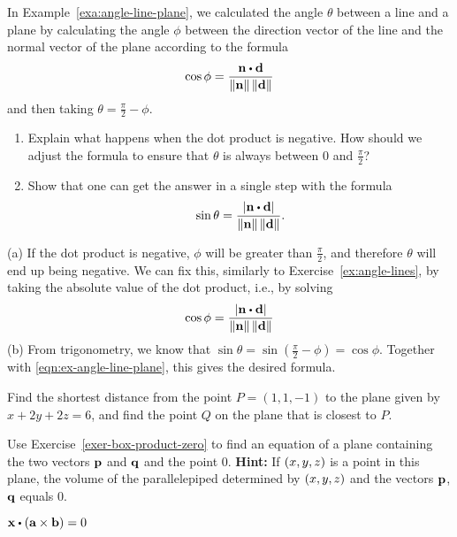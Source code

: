 \begin{enumialphparenastyle}
\begin{ex}
  In Example~\ref{exa:angle-line-plane}, we calculated the angle
  $\theta$ between a line and a plane by calculating the angle $\phi$
  between the direction vector of the line and the normal vector of
  the plane according to the formula
  \begin{equation*}
    \cos\phi =
    \frac{\vect{n}\dotprod\vect{d}}{\norm{\vect{n}}\norm{\vect{d}}}
  \end{equation*}
  and then taking $\theta = \frac{\pi}{2}-\phi$.
  \begin{enumerate}
  \item Explain what happens when the dot product is negative. How
    should we adjust the formula to ensure that $\theta$ is always
    between $0$ and $\frac{\pi}{2}$?
  \item Show that one can get the answer in a single step with the
    formula
    \begin{equation*}
      \sin\theta =
      \frac{\abs{\vect{n}\dotprod\vect{d}}}{\norm{\vect{n}}\norm{\vect{d}}}.
    \end{equation*}
  \end{enumerate}
  \begin{sol}
    (a) If the dot product is negative, $\phi$ will be greater than
    $\frac{\pi}{2}$, and therefore $\theta$ will end up being
    negative. We can fix this, similarly to
    Exercise~\ref{ex:angle-lines}, by taking the absolute value of the
    dot product, i.e., by solving
    \begin{equation}\label{eqn:ex-angle-line-plane}
      \cos\phi =
      \frac{\abs{\vect{n}\dotprod\vect{d}}}{\norm{\vect{n}}\norm{\vect{d}}}
    \end{equation}
    (b) From trigonometry, we know that $\sin\theta =
    \sin(\frac{\pi}{2}-\phi) = \cos\phi$. Together with
    {\eqref{eqn:ex-angle-line-plane}}, this gives the desired formula.
  \end{sol}
\end{ex}

\begin{ex}
  Find the shortest distance from the point $P = (1,1,-1)$ to the plane
  given by $x + 2y + 2z = 6$, and find the point $Q$ on the plane
  that is closest to $P$.
\end{ex}

\begin{ex}
  Use Exercise~\ref{exer-box-product-zero} to find an equation of a
  plane containing the two vectors $\mbox{\bf p}$ and $\mbox{\bf q}$ and the
  point $0$. \textbf{Hint:} If $\left(x,y,z\right)$ is a point in this
  plane, the volume of the parallelepiped determined by $\left(x,y,z\right)$
  and the vectors $\mbox{\bf p}$, $\mbox{\bf q}$ equals 0.
  \begin{sol}
    $\vect{x}\dotprod \tup{\vect{a}\times \vect{b}} =0$
  \end{sol}
\end{ex}

\end{enumialphparenastyle}
